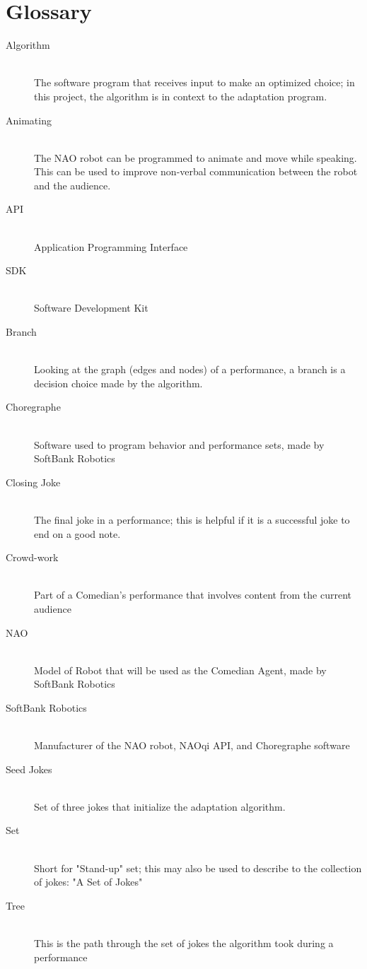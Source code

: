 \documentclass[onecolumn, draftclsnofoot,10pt, compsoc]{IEEEtran}
\begin{document}
\section{Glossary}
\begin{description}
  \item [Algorithm] \hfill \\ The software program that receives input to make an optimized choice; in this project, the algorithm is in context to the adaptation program.
  \item [Animating] \hfill \\ The NAO robot can be programmed to animate and move while speaking. This can be used to improve non-verbal communication between the robot and the audience.
  \item [API] \hfill \\ Application Programming Interface
  \item [SDK] \hfill \\ Software Development Kit
  \item [Branch] \hfill \\Looking at the graph (edges and nodes) of a performance, a branch is a decision choice made by the algorithm.
  \item [Choregraphe] \hfill \\ Software used to program behavior and performance sets, made by SoftBank Robotics
  \item [Closing Joke] \hfill \\The final joke in a performance; this is helpful if it is a successful joke to end on a good note.
  \item [Crowd-work] \hfill \\ Part of a Comedian's performance that involves content from the current audience
  \item [NAO] \hfill \\ Model of Robot that will be used as the Comedian Agent, made by SoftBank Robotics
  \item [SoftBank Robotics] \hfill \\ Manufacturer of the NAO robot, NAOqi API, and Choregraphe software
  \item [Seed Jokes] \hfill \\ Set of three jokes that initialize the adaptation algorithm.
  \item [Set] \hfill \\Short for "Stand-up" set; this may also be used to describe to the collection of jokes: "A Set of Jokes"
  \item [Tree] \hfill \\This is the path through the set of jokes the algorithm took during a performance

\end{description}



\end{document}
